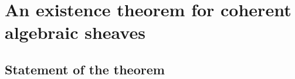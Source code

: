 \section{An existence theorem for coherent algebraic sheaves}
\label{section:III.5}


\subsection{Statement of the theorem}
\label{subsection:III.5.1}








